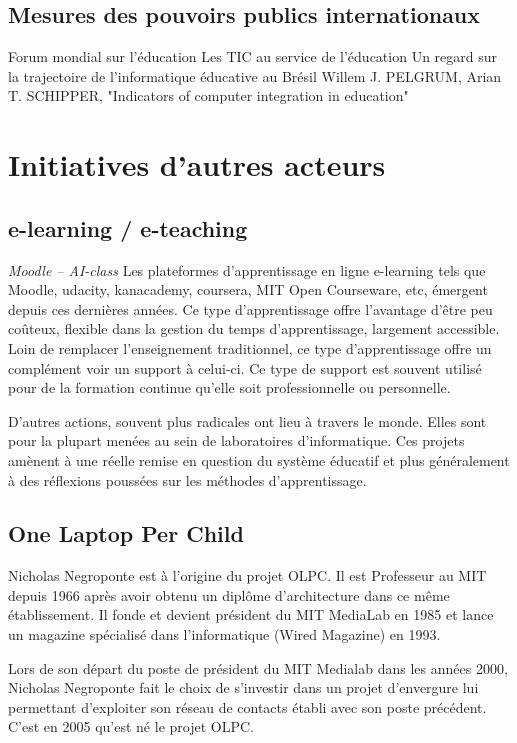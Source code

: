\section{Mesures des pouvoirs publics internationaux}
Forum mondial sur l’éducation \cite{educ_forum}
Les TIC au service de l’éducation \cite{tics}
Un regard sur la trajectoire de l’informatique éducative au Brésil \cite{peixoto2006regard}
Willem J. PELGRUM, Arian T. SCHIPPER, "Indicators of computer integration in education" \cite{pelgrum1993indicators}


\chapter{Initiatives d'autres acteurs}
\label{chap:initialivesautres}

\section{e-learning / e-teaching}
\textit{Moodle -- AI-class}
Les plateformes d'apprentissage en ligne \og{}e-learning\fg{} tels
que Moodle, udacity, kanacademy, coursera, MIT Open Courseware, etc, 
émergent depuis ces dernières années. Ce type d'apprentissage offre l'avantage d'être peu
coûteux, flexible dans la gestion du temps d'apprentissage, largement
accessible. Loin de remplacer l'enseignement traditionnel, ce type
d'apprentissage offre un complément voir un support à celui-ci. Ce
type de support est souvent utilisé pour de la formation continue
qu'elle soit professionnelle ou personnelle.

D'autres actions, souvent plus radicales ont lieu à travers le monde. Elles sont pour la plupart menées au sein de laboratoires d'informatique. Ces projets amènent à une réelle remise en question du système éducatif et plus généralement à des réflexions poussées sur les méthodes d'apprentissage.

\section{One Laptop Per Child}

Nicholas Negroponte est à l'origine du projet \gls{OLPC}. Il est Professeur au MIT depuis 1966 après avoir obtenu un diplôme d'architecture dans ce même établissement. Il fonde et devient président du MIT MediaLab en 1985 et lance un magazine spécialisé dans l'informatique (Wired Magazine) en 1993.

Lors de son départ du poste de président du MIT Medialab dans les années 2000, Nicholas Negroponte fait le choix de s'investir dans un projet d'envergure lui permettant d'exploiter son réseau de contacts établi avec son poste précédent. C'est en 2005 qu'est né le projet \gls{OLPC}.

